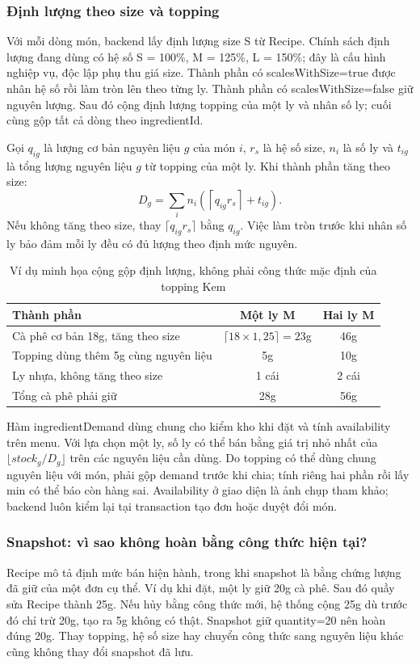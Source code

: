\subsubsection{Định lượng theo size và topping}
\label{sec:inventory-demand}
Với mỗi dòng món, backend lấy định lượng size S từ Recipe. Chính sách định lượng đang dùng có hệ số S = 100\%, M = 125\%, L = 150\%; đây là cấu hình nghiệp vụ, độc lập phụ thu giá size. Thành phần có scalesWithSize=true được nhân hệ số rồi làm tròn lên theo từng ly. Thành phần có scalesWithSize=false giữ nguyên lượng. Sau đó cộng định lượng topping của một ly và nhân số ly; cuối cùng gộp tất cả dòng theo ingredientId.

Gọi $q_{ig}$ là lượng cơ bản nguyên liệu $g$ của món $i$, $r_s$ là hệ số size, $n_i$ là số ly và $t_{ig}$ là tổng lượng nguyên liệu $g$ từ topping của một ly. Khi thành phần tăng theo size:
\[
 D_g=\sum_i n_i\left(\left\lceil q_{ig}r_s\right\rceil+t_{ig}\right).
\]
Nếu không tăng theo size, thay $\lceil q_{ig}r_s\rceil$ bằng $q_{ig}$. Việc làm tròn trước khi nhân số ly bảo đảm mỗi ly đều có đủ lượng theo định mức nguyên.

\begin{table}[htbp]\centering\small
\begin{tabularx}{\linewidth}{|X|c|c|}\hline
\textbf{Thành phần} & \textbf{Một ly M} & \textbf{Hai ly M}\\\hline
Cà phê cơ bản 18g, tăng theo size & $\lceil18\times1{,}25\rceil=23$g & 46g\\\hline
Topping dùng thêm 5g cùng nguyên liệu & 5g & 10g\\\hline
Ly nhựa, không tăng theo size & 1 cái & 2 cái\\\hline
Tổng cà phê phải giữ & 28g & 56g\\\hline
\end{tabularx}\caption{Ví dụ minh họa cộng gộp định lượng, không phải công thức mặc định của topping Kem}
\end{table}

Hàm ingredientDemand dùng chung cho kiểm kho khi đặt và tính availability trên menu. Với lựa chọn một ly, số ly có thể bán bằng giá trị nhỏ nhất của $\lfloor stock_g/D_g\rfloor$ trên các nguyên liệu cần dùng. Do topping có thể dùng chung nguyên liệu với món, phải gộp demand trước khi chia; tính riêng hai phần rồi lấy min có thể báo còn hàng sai. Availability ở giao diện là ảnh chụp tham khảo; backend luôn kiểm lại tại transaction tạo đơn hoặc duyệt đổi món.

\subsubsection{Snapshot: vì sao không hoàn bằng công thức hiện tại?}
Recipe mô tả định mức bán hiện hành, trong khi snapshot là bằng chứng lượng đã giữ của một đơn cụ thể. Ví dụ khi đặt, một ly giữ 20g cà phê. Sau đó quầy sửa Recipe thành 25g. Nếu hủy bằng công thức mới, hệ thống cộng 25g dù trước đó chỉ trừ 20g, tạo ra 5g không có thật. Snapshot giữ quantity=20 nên hoàn đúng 20g. Thay topping, hệ số size hay chuyển công thức sang nguyên liệu khác cũng không thay đổi snapshot đã lưu.


